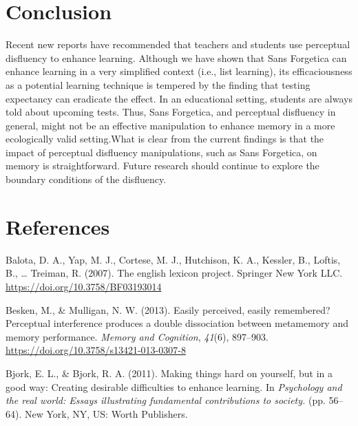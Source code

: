 \documentclass[
  english,
  jou]{apa6}
\begin{document}
\hypertarget{conclusion}{%
\section{Conclusion}\label{conclusion}}

Recent new reports have recommended that teachers and students use perceptual disfluency to enhance learning. Although we have shown that Sans Forgetica can enhance learning in a very simplified context (i.e., list learning), its efficaciousness as a potential learning technique is tempered by the finding that testing expectancy can eradicate the effect. In an educational setting, students are always told about upcoming tests. Thus, Sans Forgetica, and perceptual disfluency in general, might not be an effective manipulation to enhance memory in a more ecologically valid setting.What is clear from the current findings is that the impact of perceptual disfluency manipulations, such as Sans Forgetica, on memory is straightforward. Future research should continue to explore the boundary conditions of the disfluency.

\newpage

\hypertarget{references}{%
\section{References}\label{references}}

\begingroup
\setlength{\parindent}{-0.5in}
\setlength{\leftskip}{0.5in}

\hypertarget{refs}{}
\leavevmode\hypertarget{ref-Balota2007}{}%
Balota, D. A., Yap, M. J., Cortese, M. J., Hutchison, K. A., Kessler, B., Loftis, B., \ldots{} Treiman, R. (2007). The english lexicon project. Springer New York LLC. \url{https://doi.org/10.3758/BF03193014}

\leavevmode\hypertarget{ref-Besken2013}{}%
Besken, M., \& Mulligan, N. W. (2013). Easily perceived, easily remembered? Perceptual interference produces a double dissociation between metamemory and memory performance. \emph{Memory and Cognition}, \emph{41}(6), 897--903. \url{https://doi.org/10.3758/s13421-013-0307-8}

\leavevmode\hypertarget{ref-Bjork2011}{}%
Bjork, E. L., \& Bjork, R. A. (2011). Making things hard on yourself, but in a good way: Creating desirable difficulties to enhance learning. In \emph{Psychology and the real world: Essays illustrating fundamental contributions to society.} (pp. 56--64). New York, NY, US: Worth Publishers.
\end{document}
